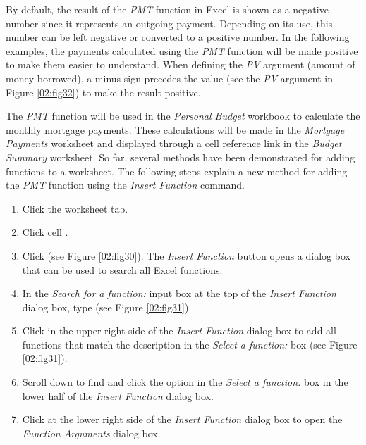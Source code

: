 By default, the result of the \textit{PMT} function in Excel is shown as a negative number since it represents an outgoing payment. Depending on its use, this number can be left negative or converted to a positive number. In the following examples, the payments calculated using the \textit{PMT} function will be made positive to make them easier to understand. When defining the \textit{PV} argument (amount of money borrowed), a minus sign precedes the value (see the \textit{PV} argument in Figure \ref{02:fig32}) to make the result positive.

The \textit{PMT} function will be used in the \textit{Personal Budget} workbook to calculate the monthly mortgage payments. These calculations will be made in the \textit{Mortgage Payments} worksheet and displayed through a cell reference link in the \textit{Budget Summary} worksheet. So far, several methods have been demonstrated for adding functions to a worksheet. The following steps explain a new method for adding the \textit{PMT} function using the \textit{Insert Function} command.

\begin{enumbox}
	\begin{enumerate}
		\item Click the  worksheet tab.
		\item Click cell .
		\item Click  (see Figure \ref{02:fig30}). The \textit{Insert Function} button opens a dialog box that can be used to search all Excel functions.
		\item In the \textit{Search for a function:} input box at the top of the \textit{Insert Function} dialog box, type  (see Figure \ref{02:fig31}). 
		\item Click  in the upper right side of the \textit{Insert Function} dialog box to add all functions that match the description in the \textit{Select a function:} box (see Figure \ref{02:fig31}).
		\item Scroll down to find and click the  option in the \textit{Select a function:} box in the lower half of the \textit{Insert Function} dialog box.
		\item Click  at the lower right side of the \textit{Insert Function} dialog box to open the \textit{Function Arguments} dialog box.
	\end{enumerate}
\end{enumbox}

